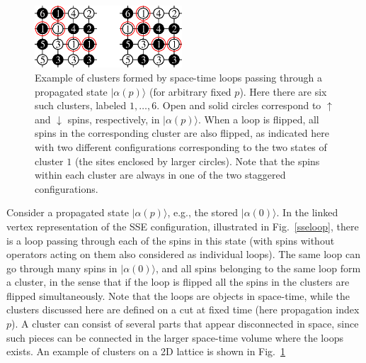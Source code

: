 \documentclass[draft,numberedheadings]{aipproc}
\begin{document}
\begin{figure}
\includegraphics[width=5.5cm, clip]{clusters.eps}
\caption{Example of clusters formed by space-time loops passing through a propagated state $|\alpha(p)\rangle$ (for arbitrary fixed $p$). Here there are
six such clusters, labeled $1,\ldots,6$. Open and solid circles correspond to $\uparrow$ and $\downarrow$ spins, respectively, in $|\alpha(p)\rangle$.
When a loop is flipped, all spins in the corresponding cluster are also flipped, as indicated here with two different configurations corresponding to
the two states of cluster $1$ (the sites enclosed by larger circles). Note that the spins within each cluster are always in one of the two staggered 
configurations.}
\label{impclusters}
\end{figure}

Consider a propagated state $|\alpha(p)\rangle$, e.g., the stored $|\alpha(0)\rangle$. In the linked vertex representation of the SSE
configuration, illustrated in Fig.~\ref{sseloop}, there is a loop passing through each of the spins in this state (with spins without operators 
acting on them also considered as individual loops). The same loop can go through many spins in $|\alpha(0)\rangle$, and all spins belonging to the
same loop form a cluster, in the sense that if the loop is flipped all the spins in the clusters are flipped simultaneously. Note that the loops
are objects in space-time, while the clusters discussed here are defined on a cut at fixed time (here propagation index $p$). A cluster 
can consist of several parts that appear disconnected in space, since such pieces can be connected in the larger space-time volume where the loops 
exists. An example of clusters on a 2D lattice is shown in Fig.~\ref{impclusters}
\end{document}
